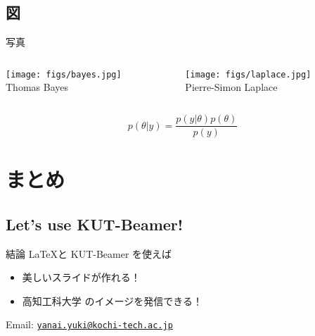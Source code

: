 \documentclass[dvipdfmx]{beamer}
\begin{document}
\subsection{図}

{
}


\begin{frame}{写真}
  \begin{columns}[t]
    \begin{column}{0.5\textwidth}
     \centering
     \texttt{[image: figs/bayes.jpg]}\\
     Thomas Bayes
   \end{column}
    \begin{column}{0.5\textwidth}
     \centering
     \texttt{[image: figs/laplace.jpg]}\\
     Pierre-Simon Laplace
   \end{column}
 \end{columns}
 \vspace{12pt}
 \[
  p(\theta | y) = \frac{p(y | \theta)p(\theta)}{p(y)}
 \]
\end{frame}


\section{まとめ}
\subsection{Let's use KUT-Beamer!}

\begin{frame}{結論}
 \LaTeX と KUT-Beamer を使えば
 \begin{itemize}
  \item 美しいスライドが作れる！
  \item \alert{高知工科大学} のイメージを発信できる！
 \end{itemize}
 \pause
 \vspace{36pt}
 
 \hspace{2em} Email:
 \href{mailto:yanai.yuki@kochi-tech.ac.jp}{\texttt{yanai.yuki@kochi-tech.ac.jp}}
 \end{frame}
\end{document}
